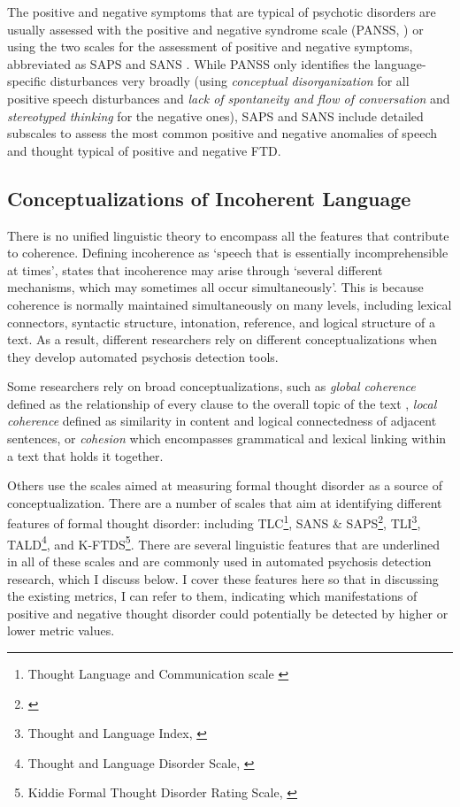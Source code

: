 The positive and negative symptoms that are typical of psychotic disorders are usually assessed with the positive and negative syndrome scale (PANSS, \cite{kay1987positive}) or using the two scales for the assessment of positive and negative symptoms, abbreviated as SAPS \citep{andreasen1984saps} and SANS \citep{andreasen1984sans}. While PANSS only identifies the language-specific disturbances very broadly (using \textit{conceptual disorganization} for all positive speech disturbances and \textit{lack of spontaneity and flow of conversation} and \textit{stereotyped thinking} for the negative ones), SAPS and SANS include detailed subscales to assess the most common positive and negative anomalies of speech and thought typical of positive and negative FTD. 


\subsection{Conceptualizations of Incoherent Language}

There is no unified linguistic theory to encompass all the features that contribute to coherence. Defining incoherence as `speech that is essentially incomprehensible at times', \citet{andreasen1986tlc} states that incoherence may arise through `several different mechanisms, which may sometimes all occur simultaneously'. This is because coherence is normally maintained simultaneously on many levels, including lexical connectors, syntactic structure, intonation, reference, and logical structure of a text. As a result, different researchers rely on different conceptualizations when they develop automated psychosis detection tools. 

Some researchers rely on broad conceptualizations, such as \textit{global coherence} defined as the relationship of every clause to the overall topic of the text \citep{glosser1991patterns}, \textit{local coherence} defined as similarity in content and logical connectedness of adjacent sentences, or \textit{cohesion} which encompasses grammatical and lexical linking within a text that holds it together. 

Others use the scales aimed at measuring formal thought disorder as a source of conceptualization. There are a number of scales that aim at identifying different features of formal thought disorder: including TLC\footnote{Thought Language and Communication scale \citet{andreasen1986tlc}}, SANS \& SAPS\footnote{\cite{andreasen1984sans, andreasen1984saps}}, TLI\footnote{Thought and Language Index, \citet{liddle2002tli}}, TALD\footnote{Thought and Language Disorder Scale, \citet{kircher2014tald}}, and K-FTDS\footnote{Kiddie Formal Thought Disorder Rating Scale, \citet{caplan1989kftds}}. There are several linguistic features that are underlined in all of these scales and are commonly used in automated psychosis detection research, which I discuss below. I cover these features here so that in discussing the existing metrics, I can refer to them, indicating which manifestations of positive and negative thought disorder could potentially be detected by higher or lower metric values.

